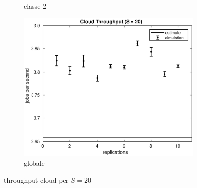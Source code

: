 \begin{figure}[!h]
\begin{subfigure}[t]{0.49\textwidth}
\caption{classe 2}
\label{20_x2cloud}
\end{subfigure}
%
\begin{subfigure}[t]{0.5\textwidth}
\includegraphics[width=\textwidth]{figures/simul/20_500K_xcloud}
\caption{globale}
\label{20_xcloud}
\end{subfigure}
%
\caption{throughput cloud per $S = 20$}
\end{figure}
%

